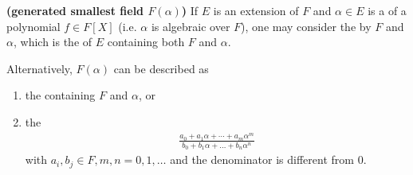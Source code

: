 \documentclass{article}
\newcommand{\bfs}[1]{\textbf{({#1}) }}
\begin{document}
\begin{defa}\bfs{generated smallest field $F(\alpha)$}\label{def:danczvd}
If $E$ is an extension of $F$ and $\alpha \in E$ is a  of a polynomial $f \in F[X]$ (i.e.  $\alpha$ is algebraic over $F$), one may consider the  by $F$ and $\alpha$, which is the  of $E$ containing both $F$ and $\alpha$.


Alternatively, $F(\alpha)$ can be described as
\begin{enumerate}
    \item the  containing $F$ and $\alpha$, or
    \item the 
\begin{align*}
\frac{a_{0}+a_{1} \alpha+\cdots+a_{m} \alpha^{m}}{b_{0}+b_{1} \alpha+\ldots+b_{n} \alpha^{n}}
\end{align*}
with $a_{i}, b_{j} \in F, m, n=0,1, \ldots$ and the denominator is different from $0$.
\end{enumerate} 
\end{defa}
\end{document}
